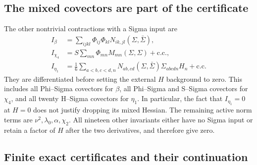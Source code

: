 \subsection{The mixed covectors are part of the certificate}

The other nontrivial contractions with a Sigma input are
\begin{align}
 I_\beta&=\sum_{ijkl}\Phi_{ij}\Phi_{kl}
                  N_{ik,jl}(\Sigma,\bar\Sigma),\\
 I_{\chi_4}&=S\sum_{mn}\Phi_{mn}M_{mn}(\Sigma,\Sigma)+\mathrm{c.c.},\\
 I_{\eta_1}&=\frac16\sum_{a<b,c<d,n}
         N_{ab,cd}(\Sigma,\bar\Sigma)\Sigma_{abcdn}H_n
         +\mathrm{c.c.}
\end{align}
They are differentiated before setting the external $H$ background to zero.
This includes all Phi--Sigma covectors for $\beta$, all Phi--Sigma and
S--Sigma covectors for $\chi_4$, and all twenty H--Sigma covectors for
$\eta_1$.  In particular, the fact that $I_{\eta_1}=0$ at $H=0$ does
not justify dropping its mixed Hessian.
The remaining active norm terms are $\nu^2,\lambda_0,\alpha,\chi_2$.
All nineteen other invariants either have no Sigma input or retain a
factor of $H$ after the two derivatives, and therefore give zero.

\subsection{Finite exact certificates and their continuation}

